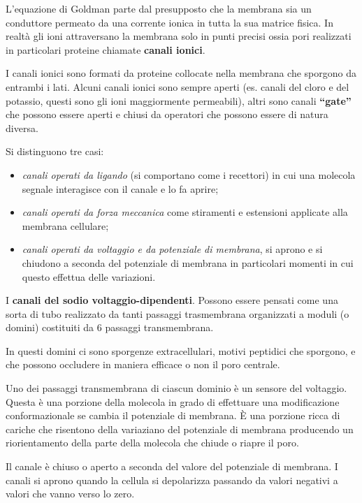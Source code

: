 \documentclass[]{article}
\begin{document}
L'equazione di Goldman parte dal presupposto che la membrana sia un
conduttore permeato da una corrente ionica in tutta la sua matrice
fisica. In realtà gli ioni attraversano la membrana solo in punti
precisi ossia pori realizzati in particolari proteine chiamate
\textbf{canali ionici}.

I canali ionici sono formati da proteine collocate nella membrana che
sporgono da entrambi i lati. Alcuni canali ionici sono sempre aperti
(es. canali del cloro e del potassio, questi sono gli ioni maggiormente
permeabili), altri sono canali \textbf{``gate''} che possono essere
aperti e chiusi da operatori che possono essere di natura diversa.

Si distinguono tre casi:

\begin{itemize}
\itemsep1pt\parskip0pt
\item
  \emph{canali operati da ligando} (si comportano come i recettori) in
  cui una molecola segnale interagisce con il canale e lo fa aprire;
\item
  \emph{canali operati da forza meccanica} come stiramenti e estensioni
  applicate alla membrana cellulare;
\item
  \emph{canali operati da voltaggio e da potenziale di membrana}, si
  aprono e si chiudono a seconda del potenziale di membrana in
  particolari momenti in cui questo effettua delle variazioni.
\end{itemize}

I \textbf{canali del sodio voltaggio-dipendenti}. Possono essere pensati
come una sorta di tubo realizzato da tanti passaggi trasmembrana
organizzati a moduli (o domini) costituiti da 6 passaggi transmembrana.

In questi domini ci sono sporgenze extracellulari, motivi peptidici che
sporgono, e che possono occludere in maniera efficace o non il poro
centrale.

Uno dei passaggi transmembrana di ciascun dominio è un sensore del
voltaggio. Questa è una porzione della molecola in grado di effettuare
una modificazione conformazionale se cambia il potenziale di membrana. È
una porzione ricca di cariche che risentono della variaziano del
potenziale di membrana producendo un riorientamento della parte della
molecola che chiude o riapre il poro.

Il canale è chiuso o aperto a seconda del valore del potenziale di
membrana. I canali si aprono quando la cellula si depolarizza passando
da valori negativi a valori che vanno verso lo zero.
\end{document}
